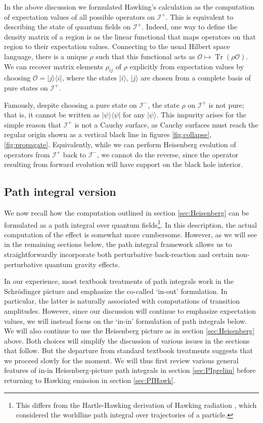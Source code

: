 \documentclass[letterpaper,12pt]{article}
\DeclareMathOperator{\Tr}{Tr}
\newcommand*{\scri}{\mathscr{I}} %
\begin{document}
In the above discussion we formulated Hawking's calculation as the computation of expectation values of all possible operators on $\scri^+$. This is equivalent to describing the state of quantum fields on $\scri^+$. Indeed, one way to define the density matrix of a region is as the linear functional that maps operators on that region to their expectation values. Connecting to the usual Hilbert space language, there is a unique $\rho$ such that this functional acts as $\mathcal{O}\mapsto \Tr(\rho\mathcal{O})$. We can recover matrix elements $\rho_{ij}$ of $\rho$ explicitly from expectation values by choosing $\mathcal{O}=|j\rangle\langle i|$, where the states $|i\rangle$, $|j\rangle$ are chosen from a complete basis of pure states on $\scri^+$.

Famously, despite choosing a pure state on $\scri^-$, the state $\rho$ on $\scri^+$ is not pure; that is, it cannot be written as $|\psi\rangle\langle\psi|$ for any $|\psi\rangle$.  This impurity arises for the simple reason that $\scri^+$ is not a Cauchy surface, as Cauchy surfaces must reach the regular origin shown as a vertical black line in figures \ref{fig:collapse}, \ref{fig:propagate}. Equivalently, while we can perform Heisenberg evolution of operators from $\scri^+$ back to $\scri^-$, we cannot do the reverse, since the operator resulting from forward evolution will have support on the black hole interior.

\subsection{Path integral version}
\label{sec:PIV}

We now recall how the computation outlined in section \ref{sec:Heisenberg} can be formulated as a path integral over quantum fields\footnote{This differs from the Hartle-Hawking derivation of Hawking radiation \cite{Hartle:1976tp}, which considered the worldline path integral over trajectories of a particle.}.  In this description, the actual computation of the effect is somewhat more cumbersome.  However, as we will see in the remaining sections below, the path integral framework allows us to straightforwardly incorporate both perturbative back-reaction and certain non-perturbative quantum gravity effects.

In our experience, most textbook treatments of path integrals work in the Schr\"odinger picture and emphasize the co-called `in-out' formulation.  In particular, the latter is naturally associated with computations of transition amplitudes.  However, since our discussion will continue to emphasize expectation values, we will instead focus on the `in-in' formulation of path integrals below.  We will also  continue to use the Heisenberg picture as in section \ref{sec:Heisenberg} above.  Both choices will simplify the discussion of various issues in the sections that follow. But the departure from standard textbook treatments suggests that we proceed slowly for the moment.  We will thus first review various general features of in-in Heisenberg-picture path integrals in section \ref{sec:PIprelim} before returning to Hawking emission in section \ref{sec:PIHawk}.
\end{document}

